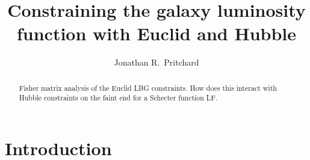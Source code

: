 \documentclass[prd,11pt,letterpaper]{revtex4}
\begin{document}
 
   \title{Constraining the galaxy luminosity function with Euclid and Hubble}
 
 \author{Jonathan R.~Pritchard}

 
 \begin{abstract}

Fisher matrix analysis of the Euclid LBG constraints. How does this interact with Hubble constraints on the faint end for a Schecter function LF.

\end{abstract}
 
 
 
\maketitle

\section{Introduction} 
\label{sec:intro}


 



 
 
\end{document}
